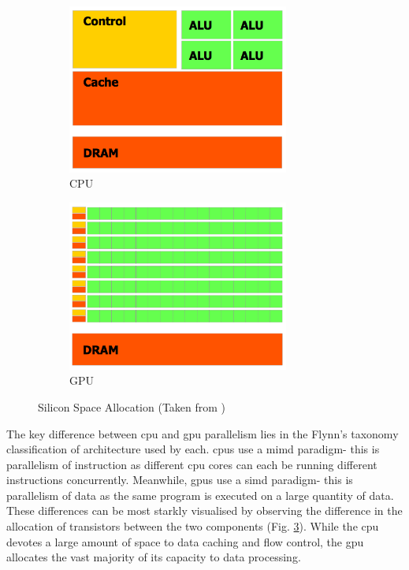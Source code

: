\documentclass{UoYCSproject}
\begin{document}
\begin{figure}[htp]
\begin{subfigure}{0.50\textwidth}
\centering
\includegraphics[width=0.8\textwidth]{Appendix/CPU}
\caption{CPU}
\label{fig:cpu_structure}
\end{subfigure}
\begin{subfigure}{0.50\textwidth}
\centering
\includegraphics[width=0.8\textwidth]{Appendix/GPU}
\caption{GPU}
\label{fig:gpu_structure}
\end{subfigure}

\caption{Silicon Space Allocation (Taken from \cite[p.2]{cuda_doc})}
\label{fig:gpu_v_cpu}
\end{figure}

The key difference between \gls{cpu} and \gls{gpu} parallelism lies in the Flynn's taxonomy classification\cite{flynns_taxonomy} of architecture used by each.
\gls{cpu}s use a \gls{mimd} paradigm- this is parallelism of instruction as different \gls{cpu} cores can each be running different instructions concurrently.
Meanwhile, \gls{gpu}s use a \gls{simd} paradigm- this is parallelism of data as the same program is executed on a large quantity of data.
These differences can be most starkly visualised by observing the difference in the allocation of transistors between the two components (Fig. \ref{fig:gpu_v_cpu}). While the \gls{cpu} devotes a large amount of space to data caching and flow control, the \gls{gpu} allocates the vast majority of its capacity to data processing.\cite[p.2]{cuda_doc}
\end{document}
